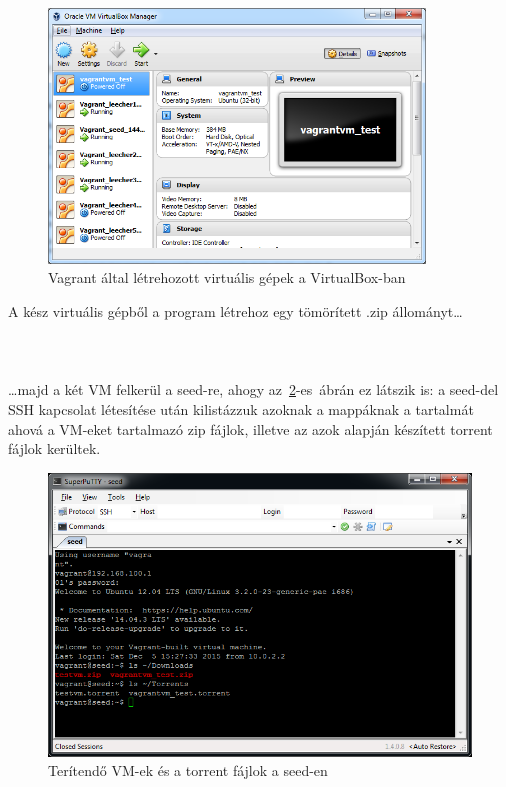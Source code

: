 \begin{figure}[ht]
\centering
\includegraphics[width=100mm, keepaspectratio]{figures/test_vbox.png}
\caption{Vagrant által létrehozott virtuális gépek a VirtualBox-ban}
\label{fig:vboxcap}
\end{figure}
A kész virtuális gépből a program létrehoz egy tömörített .zip állományt\ldots\\\\
\\\\
\ldots majd a két VM felkerül a seed-re, ahogy az~\ref{fig:seed_files}-es~ábrán ez látszik is:  a seed-del SSH kapcsolat létesítése után kilistázzuk azoknak a mappáknak a tartalmát ahová a VM-eket tartalmazó zip fájlok, illetve az azok alapján készített torrent fájlok kerültek.

\begin{figure}[ht]
\centering
\includegraphics[width=120mm, keepaspectratio]{figures/test_seed_files.png}
\caption{Terítendő VM-ek és a torrent fájlok a seed-en}
\label{fig:seed_files}
\end{figure}


